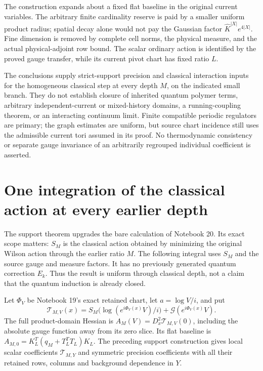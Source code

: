 \documentclass[11pt]{article}
\theoremstyle{remark}
\begin{document}
The construction expands about a fixed flat baseline in the original
current variables. The arbitrary finite cardinality reserve is paid by
a smaller uniform product radius; spatial decay alone would not pay
the Gaussian factor $\widehat K^{|X|}e^{4|X|}$. Fine dimension is removed
by complete cell norms, the physical measure, and the actual
physical-adjoint row bound. The scalar ordinary action is identified by
the proved gauge transfer, while its current pivot chart has fixed
ratio $L$.

The conclusions supply strict-support precision and classical
interaction inputs for the homogeneous classical step at every depth
$M$, on the indicated small branch. They do not establish closure of
inherited quantum polymer terms, arbitrary independent-current or
mixed-history domains, a running-coupling theorem, or an interacting
continuum limit. Finite compatible periodic regulators are primary;
the graph estimates are uniform, but source chart incidence still uses
the admissible current tori assumed in its proof. No thermodynamic
consistency or separate gauge invariance of an arbitrarily regrouped
individual coefficient is asserted.

\section{One integration of the classical action at every earlier depth}
\label{ci-section}

The support theorem upgrades the bare calculation of Notebook 20.
Its exact scope matters: $S_M$ is the classical action obtained
by minimizing the original Wilson action through the earlier
ratio $M$. The following integral uses $S_M$ and the source
gauge and measure factors. It has no previously generated
quantum correction $E_k$. Thus the result is uniform through
classical depth, not a claim that the quantum induction is
already closed.

Let $\Phi_V$ be Notebook 19's exact retained chart, let
$a=\log V/i$, and put
\begin{equation}\label{ci-action}
 \mathcal T_{M,V}(x)=
 S_M\bigl(\log(e^{i\Phi_V(x)}V)/i\bigr)
                    +\mathcal G(e^{i\Phi_V(x)}V).
\end{equation}
The full product-domain Hessian is
$A_M(V)=D_x^2\mathcal T_{M,V}(0)$, including the absolute
gauge function away from its zero slice. Its flat baseline is
$A_{M,0}=K_L^T(q_M+T_L^TT_L)K_L$.
The preceding support construction gives local scalar
coefficients $\mathcal T_{M,Y}$ and symmetric precision
coefficients with all their retained rows, columns and
background dependence in $Y$.
\end{document}
